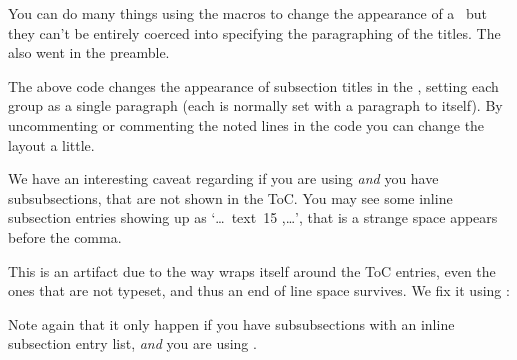    You can do many things using the  macros to change the 
appearance of a \toc\ but they can't be entirely coerced into specifying
the paragraphing of the \cmd{\subsection} titles. The
\cmd{\setupparasubsecs} also went in the preamble.
\begin{lcode}
\newcommand*{\setupparasubsecs}{%
  \let\oldnumberline\numberline
  \renewcommand*{\cftsubsectionfont}{\itshape}
  \renewcommand*{\cftsubsectionpagefont}{\itshape}
  \renewcommand{\l@subsection}[2]{%
    \def\numberline####1{\textit{####1}~}%
    \leftskip=\cftsubsectionindent
    \rightskip=\@tocrmarg
    \parfillskip=\fill
    \ifhmode ,\ \else\noindent\fi
    \ignorespaces 
    {\cftsubsectionfont ##1}~{\cftsubsectionpagefont##2}%
    \let\numberline\oldnumberline\ignorespaces}
}
\AtEndDocument{\addtocontents{toc}{\par}
\end{lcode}
The above code changes the appearance of subsection titles in the \toc, 
setting each group as a single paragraph (each is normally set with 
a paragraph to itself). By uncommenting or commenting the noted lines 
in the code you can change the layout a little. 


\begin{caveat}
  We have an interesting caveat regarding \cmd{\setupparasubsecs} if
  you are using  \emph{and} you have subsubsections,
  that are not shown in the ToC. You may see some inline subsection
  entries showing up as `\dots\ text~15 ,\dots', that is a strange
  space appears before the comma.

  This is an artifact  due to the way  wraps itself
  around the ToC entries, even the ones that are not typeset, and thus
  an end of line space survives. We fix it using \cmd{\endlinechar}:
  \begin{lcode}
    \begingroup
    \tableofcontents
    \endgroup
  \end{lcode}
  Note again that it only happen if you have subsubsections with an
  inline subsection entry list, \emph{and} you are using
  .
\end{caveat}




